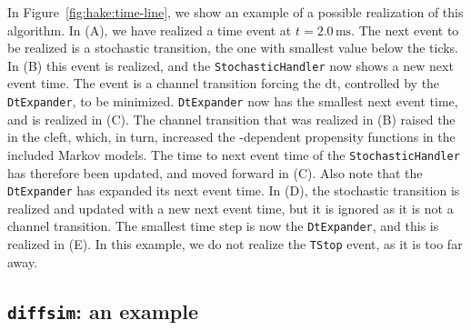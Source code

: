 In Figure~\ref{fig:hake:time-line}, we show an example of a possible
realization of this algorithm. In (A), we have realized a
time event at $t=2.0\,\mathrm{ms}$. The next event to be realized is a
stochastic transition, the one with smallest value below the ticks. In
(B) this event is realized, and the \texttt{StochasticHandler}
now shows a new next event time. The event is a channel transition
forcing the dt, controlled by the \texttt{DtExpander}, to be
minimized. \texttt{DtExpander} now has the smallest next event time,
and is realized in (C). The channel transition that was
realized in (B) raised the \CaC in the cleft, which, in turn,
increased the \Ca-dependent propensity functions in the included
Markov models. The time to next event time of the
\texttt{StochasticHandler} has therefore been updated, and moved
forward in (C). Also note that the \texttt{DtExpander} has
expanded its next event time. In (D), the stochastic transition
is realized and updated with a new next event time, but it is ignored
as it is not a channel transition. The smallest time step is now the
\texttt{DtExpander}, and this is realized in (E). In this
example, we do not realize the \texttt{TStop} event, as it is too far
away.


\subsection{\texttt{diffsim}: an example}
 

